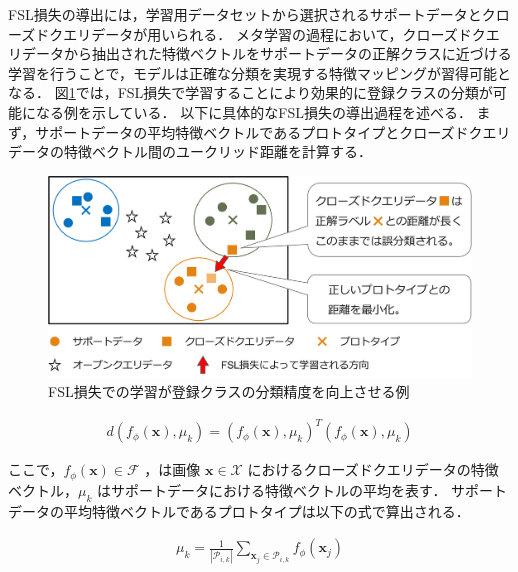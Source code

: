 \documentclass[a4paper,11pt,nomag]{jsreport}
\begin{document}
FSL損失の導出には，学習用データセットから選択されるサポートデータとクローズドクエリデータが用いられる．
メタ学習の過程において，クローズドクエリデータから抽出された特徴ベクトルをサポートデータの正解クラスに近づける学習を行うことで，モデルは正確な分類を実現する特徴マッピングが習得可能となる．
図\ref{fig:fsl_loss}では，FSL損失で学習することにより効果的に登録クラスの分類が可能になる例を示している．
以下に具体的なFSL損失の導出過程を述べる．
まず，サポートデータの平均特徴ベクトルであるプロトタイプとクローズドクエリデータの特徴ベクトル間のユークリッド距離を計算する．

\begin{figure}[tbp]
  \centering
  \includegraphics[width=\linewidth, keepaspectratio]{image/fsl_loss.png}
  \caption{FSL損失での学習が登録クラスの分類精度を向上させる例}
  \label{fig:fsl_loss}
\end{figure}

\begin{align}
  d(f_\phi(\mathbf{x}),\mu_{k})=(f_\phi(\mathbf{x}),\mu_{k})^T(f_\phi(\mathbf{x}),\mu_{k})
\end{align}

\noindent
ここで，${f_\phi(\mathbf{x})\in{\mathcal{F}}}$ ，は画像 ${{\mathbf{x}}\in{\mathcal{X}}}$ におけるクローズドクエリデータの特徴ベクトル，$\mu_{k}$ はサポートデータにおける特徴ベクトルの平均を表す．
サポートデータの平均特徴ベクトルであるプロトタイプは以下の式で算出される．

\begin{align}
  \mu_{k}=\frac{1}{|\mathcal{P}_{i,k}|}\sum_{\mathbf{x}_j\in\mathcal{P}_{i,k}}f_\phi(\mathbf{x}_j)
\end{align}
\end{document}
